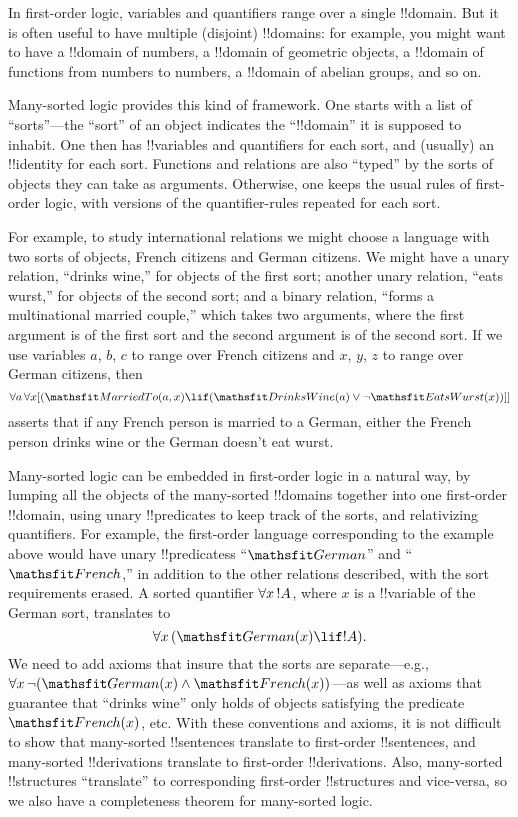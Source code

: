 \documentclass[../../include/open-logic-section]{subfiles}
\begin{document}


In first-order logic, variables and quantifiers range over a single
!!{domain}. But it is often useful to have multiple (disjoint)
!!{domain}s: for example, you might want to have a !!{domain} of numbers,
a !!{domain} of geometric objects, a !!{domain} of functions from
numbers to numbers, a !!{domain} of abelian groups, and so on.

Many-sorted logic provides this kind of framework. One starts with a
list of ``sorts''---the ``sort'' of an object indicates the
``!!{domain}'' it is supposed to inhabit. One then has !!{variable}s
and quantifiers for each sort, and (usually) an !!{identity} for each
sort. Functions and relations are also ``typed'' by the sorts of
objects they can take as arguments. Otherwise, one keeps the usual
rules of first-order logic, with versions of the quantifier-rules
repeated for each sort.

For example, to study international relations we might choose a
language with two sorts of objects, French citizens and German
citizens. We might have a unary relation, ``drinks wine,'' for objects
of the first sort; another unary relation, ``eats wurst,'' for objects
of the second sort; and a binary relation, ``forms a multinational
married couple,'' which takes two arguments, where the first argument
is of the first sort and the second argument is of the second sort. If
we use variables $a$, $b$, $c$ to range over French citizens and $x$, $y$, $z$
to range over German citizens, then
\[
\lforall[a][\lforall x][(\Atom{\Obj{MarriedTo}}{a,x} \lif
(\Atom{\Obj{DrinksWine}}{a} \lor \lnot \Atom{\Obj{EatsWurst}}{x})]]
\]
asserts that if any French person is married to a German, either the
French person drinks wine or the German doesn't eat wurst.

Many-sorted logic can be embedded in first-order logic in a natural
way, by lumping all the objects of the many-sorted !!{domain}s together
into one first-order !!{domain}, using unary !!{predicate}s to keep track of
the sorts, and relativizing quantifiers. For example, the first-order
language corresponding to the example above would have unary !!{predicate}ss
``$\Obj{German}$'' and ``$\Obj{French}$,'' in addition to the other relations
described, with the sort requirements erased. A sorted quantifier $\lforall[x][!A]$, where $x$ is a !!{variable} of the German sort, translates to
\[
\lforall[x][(\Atom{\Obj{German}}{x} \lif !A)].
\]
We need to add axioms that insure that the sorts are separate---e.g.,
$\lforall[x][\lnot (\Atom{\Obj{German}}{x} \land
  \Atom{\Obj{French}}{x})]$---as well as axioms that guarantee that
``drinks wine'' only holds of objects satisfying the predicate
$\Atom{\Obj{French}}{x}$, etc. With these conventions and axioms, it
is not difficult to show that many-sorted !!{sentence}s translate to
first-order !!{sentence}s, and many-sorted !!{derivation}s translate
to first-order !!{derivation}s. Also, many-sorted !!{structure}s
``translate'' to corresponding first-order !!{structure}s and
vice-versa, so we also have a completeness theorem for many-sorted
logic.
\end{document}
